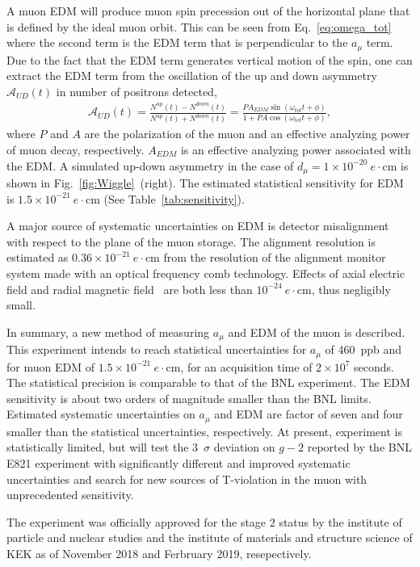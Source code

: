  A muon EDM will produce muon spin precession out of
the horizontal plane that is defined by the ideal muon orbit.
This can be seen from Eq.~\ref{eq:omega_tot}
where the second term is the EDM term that is perpendicular
to the $a_\mu$ term. Due to the fact that the EDM term generates
vertical motion of the spin, one can extract the EDM term
from the oscillation of the up and down asymmetry $\mathcal{A}_{UD}(t)$ in
number of positrons detected,
\begin{eqnarray}
\mathcal{A}_{UD}(t) = 
\frac{N^{up}(t) - N^{down}(t)}{N^{up}(t) + N^{down}(t)} =
\frac{PA_{EDM} \sin{(\omega_{tot}t+\phi)}}{1+ P A \cos{(\omega_{tot}t+\phi)}},
\end{eqnarray}
where $P$ and $A$ are the polarization of the muon and an effective analyzing power of muon decay, respectively. $A_{EDM}$ is an effective analyzing power associated with the EDM.
A simulated up-down asymmetry in the case of $d_{\mu}=1\times 10^{-20}~e\cdot\mbox{cm}$ 
is shown in Fig.~\ref{fig:Wiggle}~(right).
The estimated statistical sensitivity for EDM is $1.5\times 10^{-21}~e\cdot\mbox{cm}$ (See Table~\ref{tab:sensitivity}).

A major source of systematic uncertainties on EDM is detector misalignment with respect to
the plane of the muon storage. The alignment resolution is estimated as 
$0.36\times 10^{-21}~e\cdot\mbox{cm}$ from the resolution 
of the alignment monitor system made with an optical frequency comb technology.
Effects of axial electric field and radial magnetic field~\cite{Silenko:2017vvd}
are both less than $10^{-24}~e\cdot\mbox{cm}$, thus negligibly small.


In summary, a new method of measuring $a_{\mu}$ and EDM of the muon is described.
This experiment intends to reach statistical uncertainties for $a_{\mu}$ of 460~ppb and for muon EDM of
$1.5\times 10^{-21}~e\cdot\mbox{cm}$, for an acquisition time
of $2 \times 10^7$ seconds. The statistical precision is comparable to
that of the BNL experiment. The EDM sensitivity is about two orders of magnitude
smaller than the BNL limits.
Estimated systematic uncertainties on $a_{\mu}$ and EDM are
factor of seven and four smaller than the statistical uncertainties, respectively.
At present, experiment is statistically limited, but 
will test the 3~$\sigma$ deviation on $g-2$ reported by
the BNL E821 experiment with significantly different and improved systematic uncertainties 
and search for new sources of T-violation in the muon with unprecedented sensitivity.

The experiment was officially approved for the stage 2 status 
by the institute of particle and nuclear studies and 
the institute of materials and structure science of KEK
as of November 2018 and Ferbruary 2019, resepectively.
